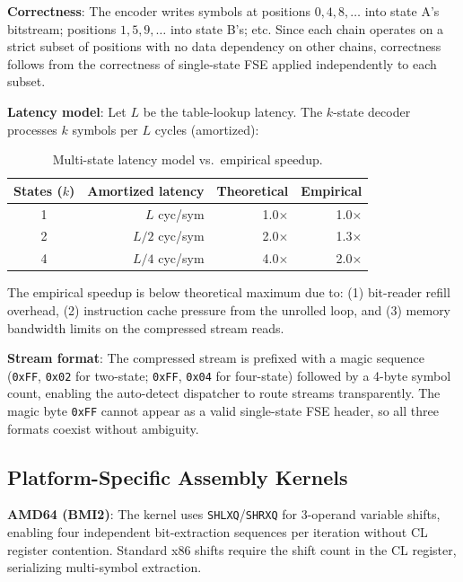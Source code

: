 \documentclass[10pt,twocolumn]{article}
\begin{document}
\textbf{Correctness}: The encoder writes symbols at positions $0, 4, 8, \ldots$ into state A's bitstream; positions $1, 5, 9, \ldots$ into state B's; etc. Since each chain operates on a strict subset of positions with no data dependency on other chains, correctness follows from the correctness of single-state FSE applied independently to each subset.

\textbf{Latency model}: Let $L$ be the table-lookup latency. The $k$-state decoder processes $k$ symbols per $L$ cycles (amortized):

\begin{table}[h]
  \centering
  \caption{Multi-state latency model vs.\ empirical speedup.}
  \label{tab:latency}
  \small
  \begin{tabular}{crrr}
    \toprule
    States ($k$) & Amortized latency & Theoretical & Empirical \\
    \midrule
    1 & $L$ cyc/sym   & 1.0$\times$ & 1.0$\times$ \\
    2 & $L/2$ cyc/sym & 2.0$\times$ & 1.3$\times$ \\
    4 & $L/4$ cyc/sym & 4.0$\times$ & 2.0$\times$ \\
    \bottomrule
  \end{tabular}
\end{table}

The empirical speedup is below theoretical maximum due to: (1) bit-reader refill overhead, (2) instruction cache pressure from the unrolled loop, and (3) memory bandwidth limits on the compressed stream reads.

\textbf{Stream format}: The compressed stream is prefixed with a magic sequence (\texttt{0xFF}, \texttt{0x02} for two-state; \texttt{0xFF}, \texttt{0x04} for four-state) followed by a 4-byte symbol count, enabling the auto-detect dispatcher to route streams transparently. The magic byte \texttt{0xFF} cannot appear as a valid single-state FSE header, so all three formats coexist without ambiguity.

\subsection{Platform-Specific Assembly Kernels}

\textbf{AMD64 (BMI2)}: The kernel uses \texttt{SHLXQ}/\texttt{SHRXQ} for 3-operand variable shifts, enabling four independent bit-extraction sequences per iteration without CL register contention. Standard x86 shifts require the shift count in the CL register, serializing multi-symbol extraction.
\end{document}
